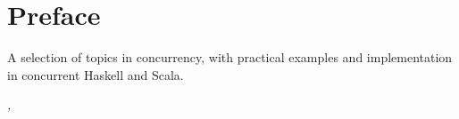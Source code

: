 \cleardoublepage
\chapter*{\protect{} Preface}

A selection of topics in concurrency, with practical examples and implementation in concurrent Haskell and Scala.

\smallskip
\noindent\textit{\myLocation, \myTime}
\begin{flushright}
    \myName
\end{flushright}

